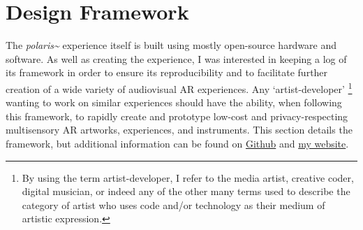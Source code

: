 



\section{Design Framework}\label{sec: polaris-framework}
The \textit{polaris\textasciitilde{}} experience itself is built using mostly open-source hardware and software. As well as creating the experience, I was interested in keeping a log of its framework in order to ensure its reproducibility and to facilitate further creation of a wide variety of audiovisual AR experiences. Any ‘artist-developer’ \footnote{By using the term artist-developer, I refer to the media artist, creative coder, digital musician, or indeed any of the other many terms used to describe the category of artist who uses code and/or technology as their medium of artistic expression.} wanting to work on similar experiences should have the ability, when following this framework, to rapidly create and prototype low-cost and privacy-respecting multisensory AR artworks, experiences, and instruments. This section details the framework, but additional information can be found on \href{https://github.com/sambilbow/polaris}{Github} and \href{https://sambilbow.com}{my website}.

